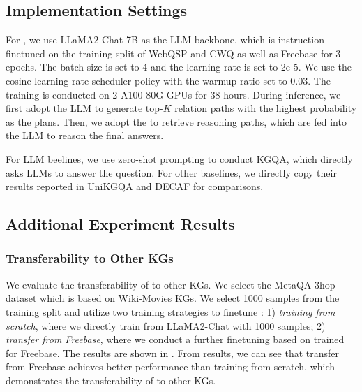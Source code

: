 \subsection{Implementation Settings}\label{app:settings}
For \ourmethod, we use LLaMA2-Chat-7B \citep{touvron2023llama} as the LLM backbone, which is instruction finetuned on the training split of WebQSP and CWQ as well as Freebase for 3 epochs. The batch size is set to 4 and the learning rate is set to 2e-5. We use the cosine learning rate scheduler policy with the warmup ratio set to 0.03. The training is conducted on 2 A100-80G GPUs for 38 hours. During inference, we first adopt the LLM to generate top-$K$ relation paths with the highest probability as the plans. Then, we adopt the  to retrieve reasoning paths, which are fed into the LLM to reason the final answers.

For LLM beelines, we use zero-shot prompting to conduct KGQA, which directly asks LLMs to answer the question. For other baselines, we directly copy their results reported in UniKGQA \citep{jiang2022unikgqa} and DECAF \citep{yu2022decaf} for comparisons.


\subsection{Additional Experiment Results}


\subsubsection{Transferability to Other KGs}
We evaluate the transferability of \ourmethod to other KGs. We select the MetaQA-3hop dataset \citep{zhang2018variational} which is based on Wiki-Movies KGs. We select 1000 samples from the training split and utilize two training strategies to finetune \ourmethod: 1) \emph{training from scratch}, where we directly train \ourmethod from LLaMA2-Chat with 1000 samples; 2) \emph{transfer from Freebase}, where we conduct a further finetuning based on \ourmethod trained for Freebase. The results are shown in . From results, we can see that transfer from Freebase achieves better performance than training from scratch, which demonstrates the transferability of \ourmethod to other KGs.

